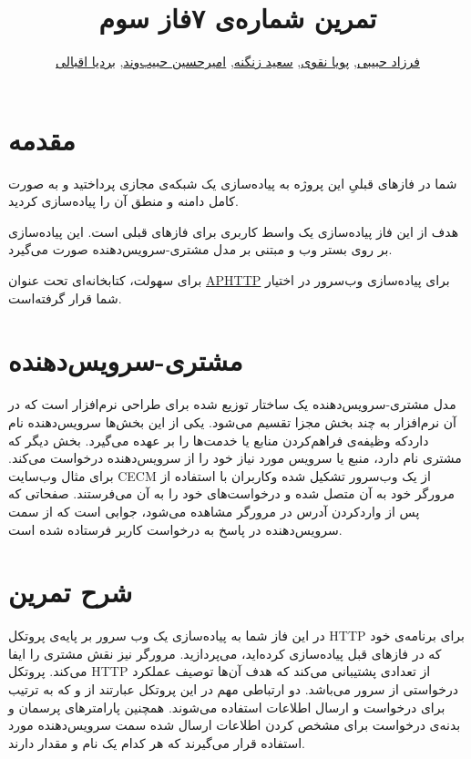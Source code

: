 \documentclass{utap}
\title{تمرین شماره‌ی ۷\normalsize\qquad فاز سوم}
\author{%
		\href{mailto:farzadhabibii98@gmail.com?subject=[AP\%20S98\%20A7]\%20}{فرزاد حبیبی},
		\href{mailto:naghavi.pooya@gmail.com?subject=[AP\%20S98\%20A7]\%20}{پویا نقوی},
	\href{mailto:zangenehsaeed412@gmail.com?subject=[AP\%20S98\%20A7]\%20}{سعید زنگنه},
		\href{mailto:ahhabibvand@gmail.com?subject=[AP\%20S98\%20A7]\%20}{امیرحسین حبیب‌وند},
	\href{mailto:bardia.eghbali@gmail.com?subject=[AP\%20S98\%20A7]\%20}{بردیا اقبالی}
}
\begin{document}
	\maketitle
	\section*{مقدمه}

		شما در فاز‌های قبلیِ این پروژه به پیاده‌سازی یک شبکه‌ی مجازی پرداختید و به صورت کامل دامنه و منطق آن را پیاده‌سازی کردید.

		هدف از این فاز پیاده‌سازی یک واسط کاربری برای فاز‌های قبلی است. این پیاده‌سازی بر روی بستر وب و مبتنی بر مدل مشتری-سرویس‌دهنده صورت می‌گیرد.
		 
		 
		برای سهولت، کتابخانه‌ای تحت عنوان \href{https://github.com/UTAP/APHTTP}{APHTTP} برای پیاده‌سازی وب‌سرور در اختیار شما قرار گرفته‌است.
	
	
	\section*{مشتری-سرویس‌دهنده}
			مدل مشتری‌-‌سرویس‌دهنده یک ساختار توزیع شده برای طراحی نرم‌افزار است که در آن نرم‌افزار به چند بخش مجزا تقسیم می‌شود. یکی از این بخش‌ها سرویس‌دهنده نام داردکه وظیفه‌ی فراهم‌کردن منابع یا خدمت‌ها را بر عهده می‌گیرد. بخش دیگر که مشتری نام دارد، منبع یا سرویس مورد نیاز خود را از سرویس‌دهنده درخواست می‌کند. برای مثال وب‌سایت CECM از یک وب‌سرور تشکیل شده وکاربران با استفاده از مرورگر خود به آن متصل شده و درخواست‌های خود را به آن می‌فرستند. صفحاتی که پس از واردکردن آدرس
	 در مرورگر مشاهده می‌شود، جوابی است که از سمت سرویس‌دهنده در پاسخ به درخواست کاربر فرستاده شده است.


	\section{شرح تمرین}

		در این فاز شما به پیادەسازی یک وب سرور بر پایه‌ی پروتکل
		 HTTP
		  برای برنامه‌ی خود که در فازهای قبل پیادەسازی کردەاید، می‌پردازید. مرورگر نیز نقش مشتری را ایفا می‌کند. پروتکل HTTP از تعدادی  پشتیبانی می‌کند که هدف آن‌ها توصیف عملکرد درخواستی از سرور می‌باشد. دو  ارتباطی مهم در این پروتکل عبارتند از  و  که به ترتیب برای درخواست و ارسال اطلاعات استفاده می‌شوند. همچنین پارامتر‌های پرسمان و بدنه‌ی درخواست برای مشخص کردن اطلاعات ارسال شده سمت سرویس‌دهنده مورد استفاده قرار می‌گیرند که هر کدام یک نام و مقدار دارند. 
		
\end{document}

